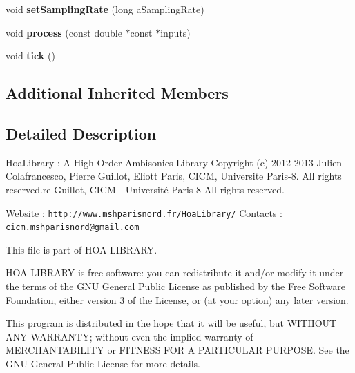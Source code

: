 \begin{DoxyCompactItemize}
\item 
\hypertarget{class_ambisonic_spectrum_a7bd00bbe40241407a84ea6dc8c5df1bd}{void {\bfseries set\-Sampling\-Rate} (long a\-Sampling\-Rate)}\label{class_ambisonic_spectrum_a7bd00bbe40241407a84ea6dc8c5df1bd}

\item 
\hypertarget{class_ambisonic_spectrum_aec69f768c208a83f5ce55268b942ca1a}{void {\bfseries process} (const double $\ast$const $\ast$inputs)}\label{class_ambisonic_spectrum_aec69f768c208a83f5ce55268b942ca1a}

\item 
\hypertarget{class_ambisonic_spectrum_ab3ab5df934defcaa6e86502f61589b21}{void {\bfseries tick} ()}\label{class_ambisonic_spectrum_ab3ab5df934defcaa6e86502f61589b21}

\end{DoxyCompactItemize}
\subsection*{Additional Inherited Members}


\subsection{Detailed Description}
Hoa\-Library \-: A High Order Ambisonics Library Copyright (c) 2012-\/2013 Julien Colafrancesco, Pierre Guillot, Eliott Paris, C\-I\-C\-M, Universite Paris-\/8. All rights reserved.\-re Guillot, C\-I\-C\-M -\/ Université Paris 8 All rights reserved.

Website \-: \href{http://www.mshparisnord.fr/HoaLibrary/}{\tt http\-://www.\-mshparisnord.\-fr/\-Hoa\-Library/} Contacts \-: \href{mailto:cicm.mshparisnord@gmail.com}{\tt cicm.\-mshparisnord@gmail.\-com}

This file is part of H\-O\-A L\-I\-B\-R\-A\-R\-Y.

H\-O\-A L\-I\-B\-R\-A\-R\-Y is free software\-: you can redistribute it and/or modify it under the terms of the G\-N\-U General Public License as published by the Free Software Foundation, either version 3 of the License, or (at your option) any later version.

This program is distributed in the hope that it will be useful, but W\-I\-T\-H\-O\-U\-T A\-N\-Y W\-A\-R\-R\-A\-N\-T\-Y; without even the implied warranty of M\-E\-R\-C\-H\-A\-N\-T\-A\-B\-I\-L\-I\-T\-Y or F\-I\-T\-N\-E\-S\-S F\-O\-R A P\-A\-R\-T\-I\-C\-U\-L\-A\-R P\-U\-R\-P\-O\-S\-E. See the G\-N\-U General Public License for more details.

